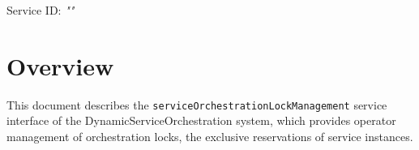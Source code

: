 \documentclass[a4paper]{arrowhead}
\begin{document}
\sloppy

\ArrowheadSetup

\begin{center}
  \vspace*{1cm}
  \huge{\arrowtitle}

  \vspace*{0.2cm}
  \LARGE{\arrowtype}
  \vspace*{1cm}

  \Large{Service ID: \textit{"\arrowid"}}

  \vspace*{\fill}


  \vspace*{1cm}
  \vspace*{\fill}

  \begin{abstract}
    This document describes the HTTP/1.1 protocol with TLS payload security and JSON payload encoding variant of the \texttt{service\allowbreak{}Orchestration\allowbreak{}Lock\allowbreak{}Management} service of the DynamicServiceOrchestration system.
  \end{abstract}

  \vspace*{1cm}
\end{center}

\newpage

\tableofcontents
\newpage

\section{Overview}
\label{sec:overview}

This document describes the \texttt{service\allowbreak{}Orchestration\allowbreak{}Lock\allowbreak{}Management} service interface of the DynamicServiceOrchestration system, which provides operator management of orchestration locks, the exclusive reservations of service instances.
\end{document}
